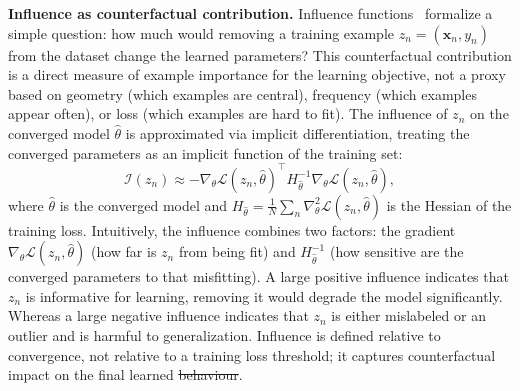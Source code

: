 \documentclass[12pt, a4paper, twoside]{book}
\makeatletter
\numberwithin{equation}{chapter}
\theoremstyle{plain}
\theoremstyle{definition}
\theoremstyle{remark}
\newenvironment{foldable}{}{}
\providecommand{\DIFaddtex}[1]{{\protect\color{blue}\uwave{#1}}} %
\providecommand{\DIFdeltex}[1]{{\protect\color{red}\sout{#1}}} %
\providecommand{\DIFaddbegin}{} %
\providecommand{\DIFaddend}{} %
\providecommand{\DIFdelbegin}{} %
\providecommand{\DIFdelend}{} %
\providecommand{\DIFadd}[1]{\texorpdfstring{\DIFaddtex{#1}}{#1}} %
\providecommand{\DIFdel}[1]{\texorpdfstring{\DIFdeltex{#1}}{}} %
\newcommand{\DIFscaledelfig}{0.5}
\newlength{\DIFdelgraphicswidth} %
\newlength{\DIFdelgraphicsheight} %
\newcommand{\DIFaddincludegraphics}[2][]{{\color{blue}\fbox{\DIFOincludegraphics[#1]{#2}}}} %
\newcommand{\DIFdelincludegraphics}[2][]{%
\sbox{\DIFdelgraphicsbox}{\DIFOincludegraphics[#1]{#2}}%
\settoboxwidth{\DIFdelgraphicswidth}{\DIFdelgraphicsbox} %
\settoboxtotalheight{\DIFdelgraphicsheight}{\DIFdelgraphicsbox} %
\scalebox{\DIFscaledelfig}{%
\parbox[b]{\DIFdelgraphicswidth}{\usebox{\DIFdelgraphicsbox}\\[-\baselineskip] \rule{\DIFdelgraphicswidth}{0em}}\llap{\resizebox{\DIFdelgraphicswidth}{\DIFdelgraphicsheight}{%
\setlength{\unitlength}{\DIFdelgraphicswidth}%
\begin{picture}(1,1)%
\thicklines\linethickness{2pt} %
{\color[rgb]{1,0,0}\put(0,0){\framebox(1,1){}}}%
{\color[rgb]{1,0,0}\put(0,0){\line( 1,1){1}}}%
{\color[rgb]{1,0,0}\put(0,1){\line(1,-1){1}}}%
\end{picture}%
}\hspace*{3pt}}} %
} %
\DeclareRobustCommand{\DIFaddbegin}{\DIFOaddbegin \let\includegraphics\DIFaddincludegraphics} %
\DeclareRobustCommand{\DIFaddend}{\DIFOaddend \let\includegraphics\DIFOincludegraphics} %
\DeclareRobustCommand{\DIFdelbegin}{\DIFOdelbegin \let\includegraphics\DIFdelincludegraphics} %
\DeclareRobustCommand{\DIFdelend}{\DIFOaddend \let\includegraphics\DIFOincludegraphics} %
\let\sout@orig\sout %
\renewcommand{\sout}[1]{\ifmmode\text{\sout@orig{\ensuremath{#1}}}\else\sout@orig{#1}\fi} %
\makeatother
\begin{document}
\begin{foldable}
  \textbf{Influence as counterfactual contribution.}
  Influence functions~\cite{cook1982residuals,koh2017understanding} formalize a simple question: how much would removing a training example $z_n = (\mathbf{x}_n, y_n)$ from the dataset change the learned parameters?
  This counterfactual contribution is a direct measure of example importance for the learning objective, not a proxy based on geometry (which examples are central), frequency (which examples appear often), or loss (which examples are hard to fit).
  The influence of $z_n$ on the converged model $\hat\theta$ is approximated via implicit differentiation, treating the converged parameters as an implicit function of the training set:
  \begin{equation}
    \mathcal{I}(z_n) \approx
    -\nabla_\theta \mathcal{L}(z_n, \hat\theta)^\top
    H_{\hat\theta}^{-1}
    \nabla_\theta \mathcal{L}(z_n, \hat\theta),
    \label{eq:influence}
  \end{equation}
  where $\hat\theta$ is the converged model and $H_{\hat\theta} = \frac{1}{N}\sum_n \nabla^2_\theta \mathcal{L}(z_n, \hat\theta)$ is the Hessian of the training loss.
  Intuitively, the influence combines two factors: the gradient $\nabla_\theta \mathcal{L}(z_n, \hat\theta)$ (how far is $z_n$ from being fit) and $H_{\hat\theta}^{-1}$ (how sensitive are the converged parameters to that misfitting).
  A large positive influence indicates that $z_n$ is informative for learning, removing it would degrade the model significantly.
  Whereas a large negative influence indicates that $z_n$ is either mislabeled or an outlier and is harmful to generalization.
  Influence is defined relative to convergence, not relative to a training loss threshold; it captures counterfactual impact on the final learned \DIFdelbegin \DIFdel{behaviour}\DIFdelend \DIFaddbegin \DIFadd{behavior}\DIFaddend .
\end{foldable}
\end{document}

